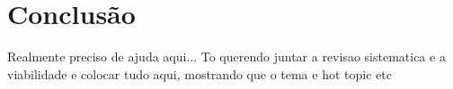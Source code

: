 \chapter{Conclusão}

Realmente preciso de ajuda aqui...
To querendo juntar a revisao sistematica e a viabilidade e colocar tudo aqui, mostrando que o tema e hot topic etc